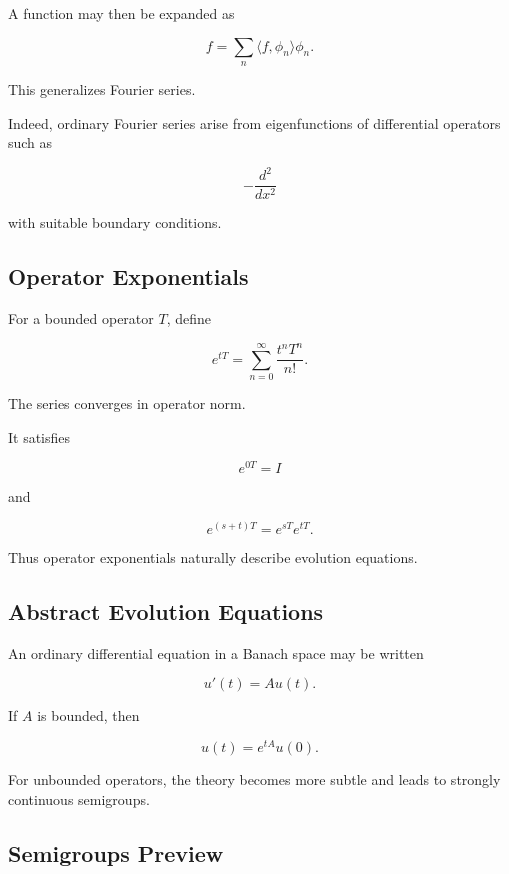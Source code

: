 A function may then be expanded as

\[
\boxed{
f
=
\sum_n
\langle f,\phi_n\rangle\phi_n.
}
\]

This generalizes Fourier series.

Indeed, ordinary Fourier series arise from eigenfunctions of differential
operators such as

\[
-\frac{d^2}{dx^2}
\]

with suitable boundary conditions.

\subsection{Operator Exponentials}
\label{subsec:operator-exponentials}

For a bounded operator \(T\), define

\[
\boxed{
e^{tT}
=
\sum_{n=0}^{\infty}
\frac{t^nT^n}{n!}.
}
\]

The series converges in operator norm.

It satisfies

\[
\boxed{
e^{0T}=I
}
\]

and

\[
\boxed{
e^{(s+t)T}
=
e^{sT}e^{tT}.
}
\]

Thus operator exponentials naturally describe evolution equations.

\subsection{Abstract Evolution Equations}
\label{subsec:abstract-evolution-equations}

An ordinary differential equation in a Banach space may be written

\[
\boxed{
u'(t)=Au(t).
}
\]

If \(A\) is bounded, then

\[
\boxed{
u(t)=e^{tA}u(0).
}
\]

For unbounded operators, the theory becomes more subtle and leads to
strongly continuous semigroups.

\subsection{Semigroups Preview}
\label{subsec:operator-semigroups-preview}

